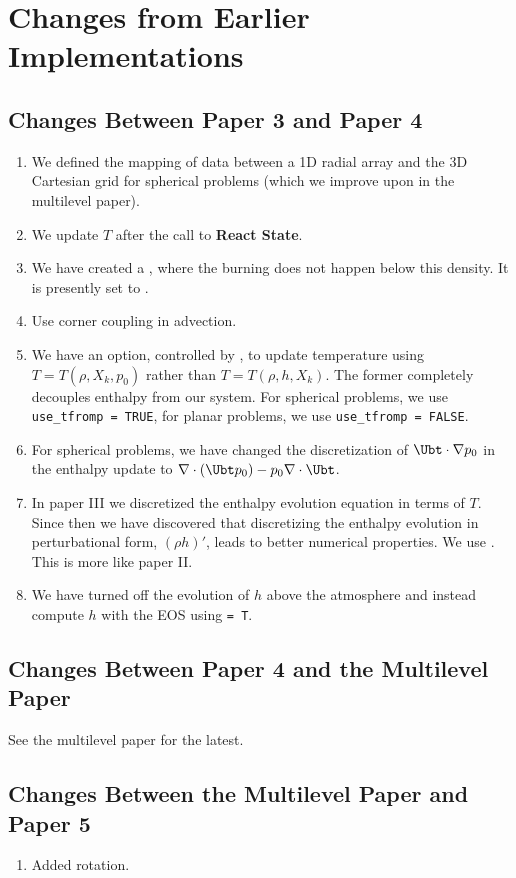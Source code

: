 \section{Changes from Earlier Implementations}
\subsection{Changes Between Paper 3 and Paper 4}
\begin{enumerate}
\item We defined the mapping of data between a 1D radial array and the 3D Cartesian
grid for spherical problems (which we improve upon in the multilevel paper).
\item We update $T$ after the call to {\bf React State}.
\item We have created a , where the burning does
not happen below this density.  It is presently set to .
\item Use corner coupling in advection.
\item We have an option, controlled by , to update temperature 
using $T=T(\rho,X_k,p_0)$ rather than $T=T(\rho,h,X_k)$.  The former completely 
decouples enthalpy from our system.  For spherical problems, we use 
{\tt use\_tfromp = TRUE}, for planar problems, we use {\tt use\_tfromp = FALSE}.
\item For spherical problems, we have changed the discretization of 
$\Ubt\cdot\nabla p_0$ in the enthalpy update to 
$\nabla\cdot(\Ubt p_0) - p_0\nabla\cdot\Ubt$.
\item In paper III we discretized the enthalpy evolution equation in
terms of $T$.  Since then we have discovered that 
discretizing the enthalpy evolution in perturbational form, $(\rho h)'$,
leads to better numerical properties.  We use .
This is more like paper II.
\item We have turned off the evolution of $h$ above the atmosphere and instead
compute $h$ with the EOS using  {\tt = T}.
\end{enumerate}


\subsection{Changes Between Paper 4 and the Multilevel Paper}
See the multilevel paper for the latest.


\subsection{Changes Between the Multilevel Paper and Paper 5}
\begin{enumerate}
\item Added rotation.
\end{enumerate}



